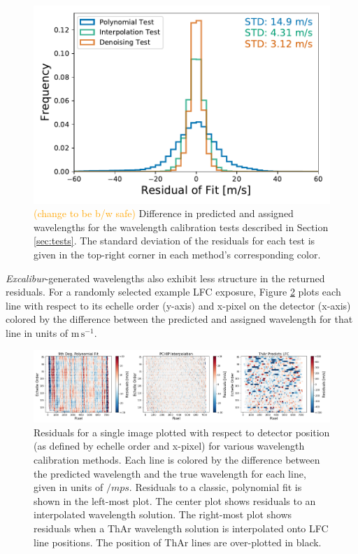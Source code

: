 \documentclass[modern]{aastex63}
\newcommand{\project}[1]{\textsl{#1}}
\newcommand{\name}{\project{Excalibur}}
\newcommand{\lz}[1]{\textcolor{orange}{#1}}
\newcommand{\mps}{\mathrm{m\,s^{-1}}}
\begin{document}
\begin{figure}[h]
\centering
\includegraphics[width=.5\textwidth]{Figures/all_results.pdf}
\caption{\lz{(change to be b/w safe)} Difference in predicted and assigned wavelengths for the wavelength calibration tests described in Section \ref{sec:tests}.  The standard deviation of the residuals for each test is given in the top-right corner in each method's corresponding color.}
\label{fig:testHists}
\end{figure} 

\name -generated wavelengths also exhibit less structure in the returned residuals.  For a randomly selected example LFC exposure, Figure \ref{fig:resid2d} plots each line with respect to its echelle order (y-axis) and x-pixel on the detector (x-axis) colored by the difference between the predicted and assigned wavelength for that line in units of $\mps$.

\begin{figure}[t]
\centering
\includegraphics[width=\textwidth]{Figures/lineResids2D.png}
\caption{Residuals for a single image plotted with respect to detector position (as defined by echelle order and x-pixel) for various wavelength calibration methods.  Each line is colored by the difference between the predicted wavelength and the true wavelength for each line, given in units of $/mps$.  Residuals to a classic, polynomial fit is shown in the left-most plot.  The center plot shows residuals to an interpolated wavelength solution.  The right-most plot shows residuals when a ThAr wavelength solution is interpolated onto LFC line positions.  The position of ThAr lines are over-plotted in black.}
\label{fig:resid2d}
\end{figure}
\end{document}

